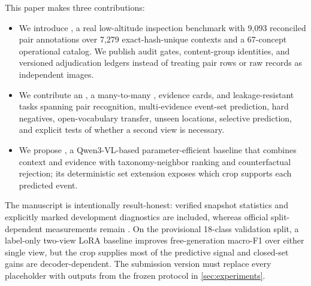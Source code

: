 This paper makes three contributions:
\begin{itemize}
    \item We introduce \dataset, a real low-altitude inspection benchmark with 9,093 reconciled pair annotations over 7,279 exact-hash-unique contexts and a 67-concept operational catalog. We publish audit gates, content-group identities, and versioned adjudication ledgers instead of treating pair rows or raw records as independent images.
    \item We contribute an \eventgraph, a many-to-many \samplegraph, evidence cards, and leakage-resistant tasks spanning pair recognition, multi-evidence event-set prediction, hard negatives, open-vocabulary transfer, unseen locations, selective prediction, and explicit tests of whether a second view is necessary.
    \item We propose \method, a Qwen3-VL-based parameter-efficient baseline that combines context and evidence with taxonomy-neighbor ranking and counterfactual rejection; its deterministic set extension exposes which crop supports each predicted event.
\end{itemize}

The manuscript is intentionally result-honest: verified snapshot statistics and explicitly marked development diagnostics are included, whereas official split-dependent measurements remain \tbd. On the provisional 18-class validation split, a label-only two-view LoRA baseline improves free-generation macro-F1 over either single view, but the crop supplies most of the predictive signal and closed-set gains are decoder-dependent. The submission version must replace every placeholder with outputs from the frozen protocol in \cref{sec:experiments}.
